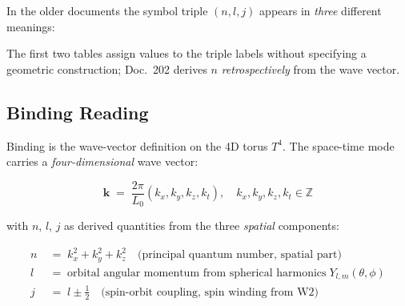 In the older documents the symbol triple $(n,l,j)$ appears in
\emph{three} different meanings:

\begin{center}
\renewcommand{\arraystretch}{1.4}
{\footnotesize
{}
}
\renewcommand{\arraystretch}{1.0}
\end{center}

The first two tables assign values to the triple labels without
specifying a geometric construction; Doc.~202 derives $n$
\emph{retrospectively} from the wave vector.

\subsection*{Binding Reading}

Binding is the wave-vector definition on the 4D torus $T^4$. The
space-time mode carries a \emph{four-dimensional} wave vector:

\begin{equation}
  \boxed{\;\mathbf{k} \;=\; \frac{2\pi}{L_0}(k_x,k_y,k_z,k_t),
  \quad k_x,k_y,k_z,k_t \in \mathbb{Z}\;}
  \tag{210.4}
\end{equation}

with $n$, $l$, $j$ as derived quantities from the three
\emph{spatial} components:

\begin{align}
  n &\;=\; k_x^2 + k_y^2 + k_z^2
       \quad\text{(principal quantum number, spatial part)} \tag{210.5}\\
  l &\;=\; \text{orbital angular momentum from spherical harmonics}
       \;Y_{l,m}(\theta,\phi) \tag{210.6}\\
  j &\;=\; l \pm \tfrac12
       \quad\text{(spin-orbit coupling, spin winding from W2)} \tag{210.7}
\end{align}

